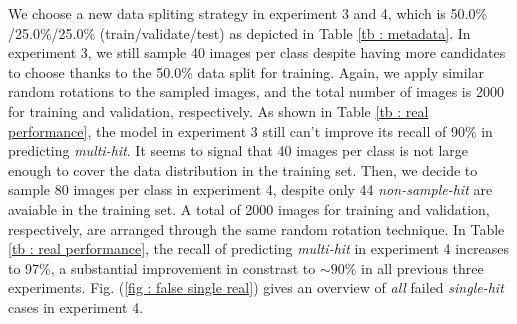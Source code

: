 We choose a new data spliting strategy in experiment 3 and 4, which is 50.0\%
/25.0\%/25.0\% (train/validate/test) as depicted in Table \ref{tb : metadata}.
In experiment 3, we still sample 40 images per class despite having more
candidates to choose thanks to the 50.0\% data split for training.  Again, we
apply similar random rotations to the sampled images, and the total number of
images is 2000 for training and validation, respectively.  As shown in Table
\ref{tb : real performance}, the model in experiment 3 still can't improve its recall
of 90\% in predicting \textit{multi-hit}.  It seems to signal that 40 images per
class is not large enough to cover the data distribution in the training set.
Then, we decide to sample 80 images per class in experiment 4, despite only 44
\textit{non-sample-hit} are avaiable in the training set.  A total of 2000
images for training and validation, respectively, are arranged through the same
random rotation technique.  In Table \ref{tb : real performance}, the recall of
predicting \textit{multi-hit} in experiment 4 increases to 97\%, a substantial
improvement in constrast to $\sim 90\%$ in all previous three experiments.  Fig.
(\ref{fig : false single real}) gives an overview of \textit{all} failed
\textit{single-hit} cases in experiment 4.



